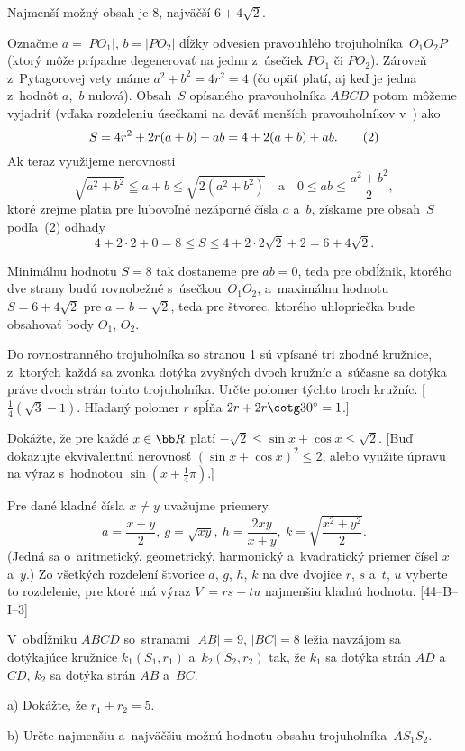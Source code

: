 {\odpoved
Najmenší možný obsah je 8, najväčší $6+4\sqrt{2}$.

\ineres
Označme $a=|PO_1|$, $b=|PO_2|$ dĺžky odvesien pravouhlého trojuholníka~$O_1O_2P$
(ktorý môže prípadne degenerovať na jednu z~úsečiek $PO_1$ či $PO_2$).
Zároveň z~Pytagorovej vety máme $a^2+b^2=4r^2=4$ (čo opäť platí, aj keď
je jedna z~hodnôt $a$,~$b$ nulová).
Obsah~$S$ opísaného pravouholníka $ABCD$ potom môžeme vyjadriť (vďaka rozdeleniu úsečkami
na deväť menších pravouholníkov v~) ako
$$
S=4r^2+2r(a+b)+ab=4+2(a+b)+ab. \tag2
$$
Ak teraz využijeme nerovnosti
$$
\sqrt{a^2+b^2}\leqq a+b\le \sqrt{2(a^2+b^2)}\quad\text{a}\quad
0\le ab\le\frac{a^2+b^2}2,
$$
ktoré zrejme platia pre ľubovoľné nezáporné čísla $a$ a~$b$, získame
pre obsah~$S$ podľa~(2) odhady
$$
4+2\cdot2+0=8\le S\le 4+2\cdot2\sqrt2+2=6+4\sqrt2.
$$

Minimálnu hodnotu $S=8$ tak dostaneme pre $ab=0$, teda pre obdĺžnik,
ktorého dve strany budú rovnobežné s~úsečkou~$O_1O_2$, a~maximálnu
hodnotu $S=6+4\sqrt2$ pre $a=b=\sqrt2$, teda pre štvorec, ktorého
uhlopriečka bude obsahovať body $O_1$, $O_2$.



Do rovnostranného trojuholníka so stranou 1 sú vpísané tri zhodné kružnice,
z~ktorých každá sa zvonka dotýka zvyšných dvoch kružníc a~súčasne sa dotýka
práve dvoch strán tohto trojuholníka. Určte polomer týchto troch kružníc.
[$\frac14(\sqrt3-1)$. Hľadaný polomer $r$ spĺňa $2r + 2r \cotg 30^{\circ}=1$.]

Dokážte, že pre každé $x\in\bb R$ platí ${-\sqrt2}\le \sin x + \cos x
\le \sqrt 2$. [Buď dokazujte ekvivalentnú nerovnosť
$(\sin x + \cos x)^2\le2$, alebo využite úpravu na výraz
s~hodnotou $\sin(x+\frac14\pi)$.]

Pre dané kladné čísla $x\ne y$ uvažujme priemery
$$
a=\frac{x+y}2,\ g=\sqrt{xy},\ h=\frac{2xy}{x+y},\
k=\sqrt{\frac{x^2+y^2}2}.
$$
(Jedná sa o~aritmetický, geometrický, harmonický a~kvadratický
priemer čísel $x$ a~$y$.)
Zo všetkých rozdelení štvorice $a$, $g$, $h$, $k$ na dve
dvojice $r$, $s$ a~$t$, $u$ vyberte to rozdelenie, pre ktoré má
výraz $V~= rs - tu$ najmenšiu kladnú hodnotu. [44--B--I--3]


\D
V~obdĺžniku $ABCD$ so~stranami $|AB|=9$, $|BC|=8$ ležia navzájom sa dotýkajúce
kružnice $k_1(S_1,r_1)$ a~$k_2(S_2,r_2)$ tak, že $k_1$ sa dotýka strán
$AD$ a~$CD$, $k_2$ sa dotýka strán $AB$ a~$BC$.
\item{a)} Dokážte, že $r_1+r_2=5$.
\item{b)} Určte najmenšiu a~najväčšiu možnú hodnotu obsahu trojuholníka~$AS_1S_2$.
\endgraf[62--A--S--1]
}

